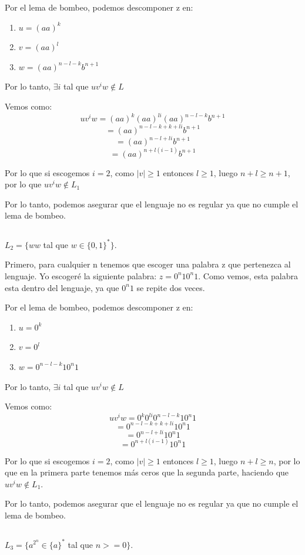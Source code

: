 \documentclass[12pt, spanish]{article}
\begin{document}
Por el lema de bombeo, podemos descomponer z en:

\begin{enumerate}
	\item $u = (aa)^k$
	\item $v = (aa)^l$
	\item $w = (aa)^{n - l - k}b^{n+1}$
\end{enumerate}

Por lo tanto, $\exists i$ tal que $uv^iw \not \in L$

\newpage

Vemos como:
	$$uv^iw = (aa)^k(aa)^{li}(aa)^{n-l-k}b^{n+1}$$ 
	$$ =  (aa)^{n - l - k + k + li}b^{n+1} $$
	$$ =  (aa)^{n - l  + li}b^{n+1}$$
	$$ =  (aa)^{n + l(i - 1)}b^{n+1}  $$

Por lo que si escogemos $i = 2$, como $|v| \geq 1$ entonces $l \geq 1$, luego $n+l \geq n+1$, por lo que $uv^iw \not \in L_1$

Por lo tanto, podemos asegurar que el lenguaje no es regular ya que no cumple el lema de bombeo.


\subsection{}
 $L_2 = \{ ww $ tal que  $ w \in \{0,1\}^* \}$.
 
Primero, para cualquier n tenemos que escoger una palabra z que pertenezca al lenguaje. Yo escogeré la siguiente palabra: $z = 0^n10^n1$. Como vemos, esta palabra esta dentro del lenguaje, ya que $0^n1$ se repite dos veces.

Por el lema de bombeo, podemos descomponer z en:

\begin{enumerate}
	\item $u = 0^k$
	\item $v = 0^l$
	\item $w =0^{n - l - k}10^n1$
\end{enumerate}

Por lo tanto, $\exists i$ tal que $uv^iw \not \in L$

Vemos como:
	$$uv^iw = 0^k0^{li}0^{n-l-k}10^n1$$ 
	$$ =  0^{n - l - k + k + li}10^n1 $$
	$$ =  0^{n - l  + li}10^n1$$
	$$ =  0^{n + l(i - 1)}10^n1  $$

Por lo que si escogemos $i = 2$, como $|v| \geq 1$ entonces $l \geq 1$, luego $n+l \geq n$, por lo que en la primera parte tenemos más ceros que la segunda parte, haciendo que $uv^iw \not \in L_1$.

Por lo tanto, podemos asegurar que el lenguaje no es regular ya que no cumple el lema de bombeo.


 \subsection{}
 $L_3 = \{ a^{2^n} \in \{a\}^{*} $ tal que  $ n >= 0 \}$.
\end{document}
